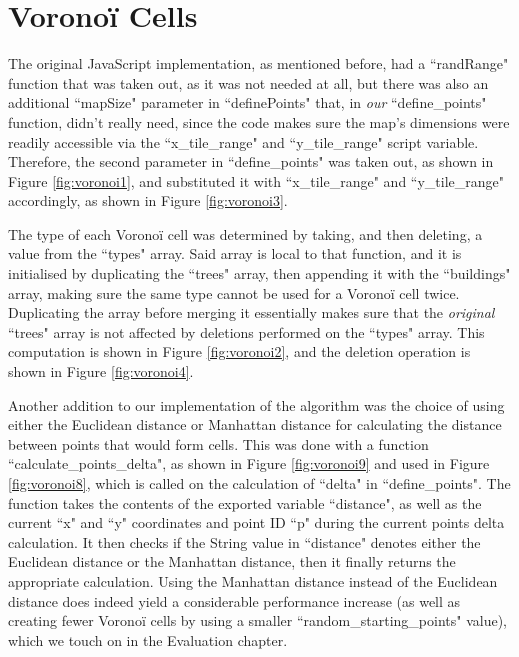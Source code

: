 \section{Voronoï Cells}

The original JavaScript implementation, as mentioned before, had a ``randRange" function that was taken out, as it was not needed at all, but there was also an additional ``mapSize" parameter in ``definePoints" that, in \textit{our} ``define\_points" function, didn't really need, since the code makes sure the map's dimensions were readily accessible via the ``x\_tile\_range" and ``y\_tile\_range" script variable. Therefore, the second parameter in ``define\_points" was taken out, as shown in Figure \ref{fig:voronoi1}, and substituted it with ``x\_tile\_range" and ``y\_tile\_range" accordingly, as shown in Figure \ref{fig:voronoi3}.

The type of each Voronoï cell was determined by taking, and then deleting, a value from the ``types" array. Said array is local to that function, and it is initialised by duplicating the ``trees" array, then appending it with the ``buildings" array, making sure the same type cannot be used for a Voronoï cell twice. Duplicating the array before merging it essentially makes sure that the \textit{original} ``trees" array is not affected by deletions performed on the ``types" array. This computation is shown in Figure \ref{fig:voronoi2}, and the deletion operation is shown in Figure \ref{fig:voronoi4}.

Another addition to our implementation of the algorithm was the choice of using either the Euclidean distance or Manhattan distance for calculating the distance between points that would form cells. This was done with a function ``calculate\_points\_delta", as shown in Figure \ref{fig:voronoi9} and used in Figure \ref{fig:voronoi8}, which is called on the calculation of ``delta" in ``define\_points". The function takes the contents of the exported variable ``distance", as well as the current ``x" and ``y" coordinates and point ID ``p" during the current points delta calculation. It then checks if the String value in ``distance" denotes either the Euclidean distance or the Manhattan distance, then it finally returns the appropriate calculation. Using the Manhattan distance instead of the Euclidean distance does indeed yield a considerable performance increase (as well as creating fewer Voronoï cells by using a smaller ``random\_starting\_points" value), which we touch on in the Evaluation chapter.

